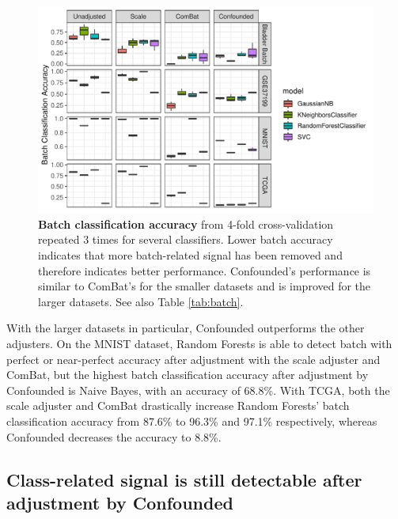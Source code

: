 \documentclass[11pt]{article}
\begin{document}
\begin{figure}
	\centering
	\includegraphics[width=\columnwidth]{figures/final/batch_accuracy.pdf}
	\caption[Batch classification accuracy]{\textbf{Batch classification accuracy} from 4-fold cross-validation repeated 3 times for several classifiers.
	Lower batch accuracy indicates that more batch-related signal has been removed and therefore indicates better performance.
	Confounded's performance is similar to ComBat's for the smaller datasets and is improved for the larger datasets.
	See also Table \ref{tab:batch}.}
	\label{fig:batch}
\end{figure}
\begin{table}
	\centering
	
	\caption[Batch classification accuracy]{
		\textbf{Batch classification accuracy} for several datasets and adjusters.
		The ideal batch adjuster would completely remove all signal due to batch and would therefore \textit{decrease} batch classification accuracy to around the baseline for all classifiers.
		See also \figurename{} \ref{fig:batch}.
	}
	\label{tab:batch}
\end{table}

With the larger datasets in particular, Confounded outperforms the other adjusters.
On the MNIST dataset, Random Forests is able to detect batch with perfect or near-perfect accuracy after adjustment with the scale adjuster and ComBat, but the highest batch classification accuracy after adjustment by Confounded is Naive Bayes, with an accuracy of 68.8\%.
With TCGA, both the scale adjuster and ComBat drastically increase Random Forests' batch classification accuracy from 87.6\% to 96.3\% and 97.1\% respectively, whereas Confounded decreases the accuracy to 8.8\%.

\subsection{Class-related signal is still detectable after adjustment by Confounded}
\end{document}
